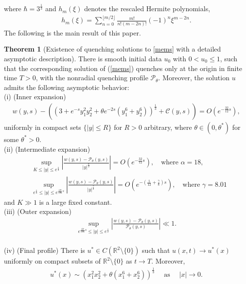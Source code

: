 \documentclass[11pt,reqno]{amsart}
\theoremstyle{definition}
\newtheorem{theorem}{Theorem}[section]
\theoremstyle{bfremark}
\numberwithin{equation}{section}
\begin{document}
where \(\hbar=3^{\frac{1}{3}}\) and \(h_m(\xi)\) denotes the rescaled Hermite polynomials,
\begin{align}
    h_m(\xi) = \sum_{n = 0}^{\lfloor m/2 \rfloor} \frac{m!}{n!(m - 2n)!} (-1)^n \xi^{m - 2n}.\label{hij}
\end{align}
The following is the main result of this paper. 
\begin{theorem}[Existence of quenching solutions to \eqref{mems} with a detailed asymptotic description]
\label{Theorem 1.1}
There is smooth initial data \(u_0\) with 
\(0<u_0 \leq 1\), such that the corresponding solution of (\ref{mems}) quenches only at the origin in finite time \(T>0\), with the nonradial quenching profile \(\mathcal{P}_{\theta}\). Moreover, the solution \(u\) admits the following asymptotic behavior:\\
(i) \textup{(Inner expansion)}\\
\begin{align}
   w(y,s)-\left(\left(3+e^{-s}y_1^2y_2^2+\theta e^{-2s}(y_1^6+y_2^6)\right)^{\frac{1}{3}}+\mathcal{C}(y,s)\right)=O(e^{-\frac{32}{12}s}),\label{innex}
\end{align}
uniformly in compact sets $\{|y| \leq R\}$ for $R > 0$ arbitrary, where $\theta \in (0, \theta^*)$ for some $\theta^* > 0$.\\
(ii) \textup{(Intermediate expansion)}\\
\begin{align}
    &\sup_{K \leq |y| \leq e^{\frac{s}{4}}}\left|\frac{w(y,s)-\mathcal{P}_{\theta}(y,s)}{|y|^{\frac{\alpha}{2}}}\right|=O(e^{-\frac{32}{12}s}), \quad \text{where } \alpha=18,\label{intex}\\
    &\sup_{e^{\frac{s}{4}} \leq |y| \leq e^{\frac{69}{196}s}}\left|\frac{w(y,s)-\mathcal{P}_{\theta}(y,s)}{|y|^{\frac{\gamma}{2}}}\right|=O(e^{-(\frac{5}{12}+\frac{\gamma}{8})s}), \quad \text{where } \gamma=8.01
\end{align}
and \(K \gg 1\) is a large fixed constant.\\
(iii) \textup{(Outer expansion)}\\
\begin{align}
    \sup_{e^{\frac{69}{196}s} \leq |y| \leq e^{\frac s 2}} \left|\frac{w(y,s)-\mathcal{P}_{\theta}(y,s)}{\mathcal{P}_{\theta}(y,s)}\right|\ll1.\label{outex}
\end{align}\\
(iv) \textup{(Final profile)} There is \(u^* \in C(\mathbb{R}^2 \setminus \{0\})\) such that \(u(x,t) \to u^{*}(x)\) uniformly on compact subsets of \(\mathbb{R}^2 \setminus \{0\}\) as \(t \to T\). Moreover,
\begin{align}
     u^{*}(x)\sim\left(x_1^2x_2^2+ \theta (x_1^6+x_2^6)\right)^{\frac{1}{3}} \quad \text{ as } \quad |x|  \to  0. \label{finpro}
\end{align}
\end{theorem}
\end{document}
